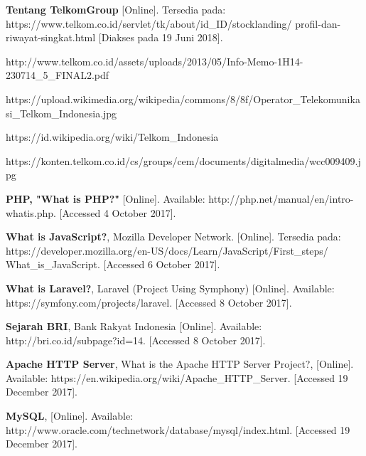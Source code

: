\begin{thebibliography}{9}
	
	\textbf {Tentang TelkomGroup} [Online]. Tersedia pada: https://www.telkom.co.id/servlet/tk/about/id\_ID/stocklanding/
	profil-dan-riwayat-singkat.html [Diakses pada 19 Juni 2018].
	
	\bibitem{} http://www.telkom.co.id/assets/uploads/2013/05/Info-Memo-1H14-230714\_5\_FINAL2.pdf
	
	https://upload.wikimedia.org/wikipedia/commons/8/8f/Operator\_Telekomunikasi\_Telkom\_Indonesia.jpg
	
	https://id.wikipedia.org/wiki/Telkom\_Indonesia
	
	https://konten.telkom.co.id/cs/groups/cem/documents/digitalmedia/wcc009409.jpg
	
	\textbf{PHP, "What is PHP?"} [Online]. Available: http://php.net/manual/en/intro-whatis.php. [Accessed 4 October 2017].		
	
	\textbf{What is JavaScript?}, Mozilla Developer Network. [Online]. Tersedia pada: https://developer.mozilla.org/en-US/docs/Learn/JavaScript/First\_steps/
	What\_is\_JavaScript. [Accessed 6 October 2017].
	
	\textbf{What is Laravel?}, Laravel (Project Using Symphony) [Online]. Available: https://symfony.com/projects/laravel. [Accessed 8 October 2017].
	
	\textbf {Sejarah BRI}, Bank Rakyat Indonesia [Online]. Available: http://bri.co.id/subpage?id=14. [Accessed 8 October 2017].
	
	\textbf {Apache HTTP Server}, What is the Apache HTTP Server Project?, [Online]. Available: https://en.wikipedia.org/wiki/Apache\_HTTP\_Server. [Accessed 19 December 2017].
	
	\textbf{MySQL}, [Online]. Available: http://www.oracle.com/technetwork/database/mysql/index.html. [Accessed 19 December 2017].
\end{thebibliography}

